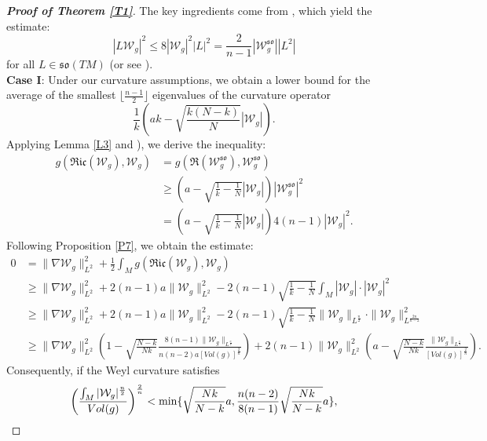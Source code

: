 \documentclass[12pt, twoside]{article}
\theoremstyle{definition}
\numberwithin{equation}{section}
\def\na {\nabla}
\begin{document}
\begin{proof}[\textbf{Proof of Theorem \ref{T1}}]
	The key ingredients come from \cite[Lemma 2.2 and Proposition 2.5]{PW21a}, which yield the estimate:
	$$|L\mathcal{W}_{g}|^{2}\leq 8|\mathcal{W}_{g}|^{2}|L|^{2}=\frac{2}{n-1}|\mathcal{W}^{\mathfrak{so}}_{g}||L^{2}|$$
	for all $L\in\mathfrak{so}(TM)$ (or see \cite[Corollary 2.3]{PW22}). \\	
	\textbf{Case I}:	Under our curvature assumptions, we obtain a lower bound for the average of the smallest $\lfloor\frac{n-1}{2}\rfloor$ eigenvalues of the curvature operator
	$$\frac{1}{k}(ak-\sqrt{\frac{k(N-k)}{N}}|\mathcal{W}_{g}|).$$
	Applying Lemma \ref{L3} and \cite[Lemma 1.8]{PW21b}), we derive the inequality:
	\begin{equation*}
	\begin{split}
	g(\mathfrak{Ric}(\mathcal{W}_{g}),\mathcal{W}_{g})&=g(\mathfrak{R}(\mathcal{W}^{\mathfrak{so}}_{g}),\mathcal{W}^{\mathfrak{so}}_{g} )\\
	&\geq (a-\sqrt{\frac{1}{k}-\frac{1}{N} }|\mathcal{W}_{g}|)|\mathcal{W}^{\mathfrak{so}}_{g}|^{2}\\
	&=(a-\sqrt{\frac{1}{k}-\frac{1}{N} }|\mathcal{W}_{g}|)4(n-1)|\mathcal{W}_{g}|^{2}.
	\end{split}
	\end{equation*}
	Following Proposition \ref{P7}, we obtain the estimate:
	\begin{equation*}
	\begin{split}
	0&=\|\na\mathcal{W}_{g}\|^{2}_{L^{2}}+\frac{1}{2}\int_{M}g\left(\mathfrak{Ric}(\mathcal{W}_{g}),\mathcal{W}_{g}\right)\\
	&\geq \|\na \mathcal{W}_{g}\|^{2}_{L^{2}}+2(n-1)a\|\mathcal{W}_{g}\|^{2}_{L^{2}}-2(n-1)\sqrt{\frac{1}{k}-\frac{1}{N} }\int_{M}|\mathcal{W}_{g}|\cdot|\mathcal{W}_{g}|^{2}\\
	&\geq \|\na \mathcal{W}_{g}\|^{2}_{L^{2}}+2(n-1)a\|\mathcal{W}_{g}\|^{2}_{L^{2}}-2(n-1)\sqrt{\frac{1}{k}-\frac{1}{N} }\|\mathcal{W}_{g}\|_{L^{\frac{n}{2}}}\cdot\|\mathcal{W}_{g}\|^{2}_{L^{\frac{2n}{n-2}}}\\
	&\geq \|\na \mathcal{W}_{g}\|^{2}_{L^{2}}\left(1-\sqrt{\frac{N-k}{Nk} }\frac{8(n-1)\|\mathcal{W}_{g}\|_{L^{\frac{n}{2}}}}{n(n-2)a[Vol(g)]^{\frac{2}{n}}} \right)+2(n-1)\|\mathcal{W}_{g}\|^{2}_{L^{2}}\left(a-\sqrt{\frac{N-k}{Nk}}\frac{\|\mathcal{W}_{g}\|_{L^{\frac{n}{2}}}}{[Vol(g)]^{\frac{2}{n}}}\right).
	\end{split}
	\end{equation*}
	Consequently, if the Weyl curvature satisfies $$\bigg{(}\frac{\int_{M}|\mathcal{W}_{g}|^{\frac{n}{2}}}{Vol(g)}\bigg{)}^{\frac{2}{n}}<\min\{\sqrt{\frac{Nk}{N-k}}a,\frac{n(n-2)}{8(n-1)}\sqrt{\frac{Nk}{N-k}}a \},$$

\end{proof}
\end{document}
